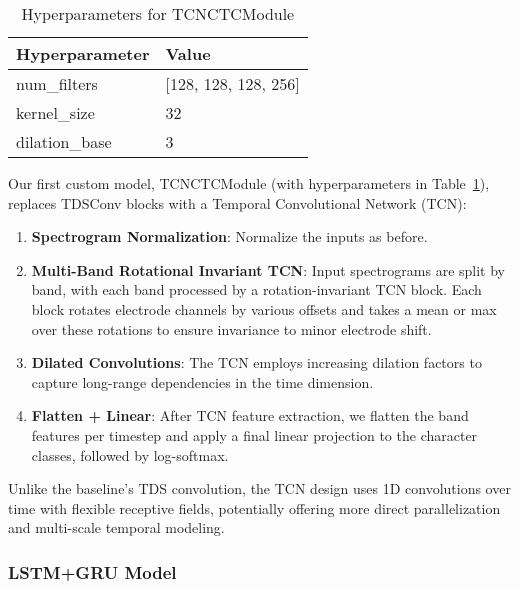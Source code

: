 \begin{table}
    \caption{Hyperparameters for TCNCTCModule}
    \label{tab:tcn_ctc}
    \centering
    \begin{tabular}{ll}
      \toprule
      \textbf{Hyperparameter} & \textbf{Value} \\
      \midrule
      num\_filters & [128, 128, 128, 256] \\
      kernel\_size & 32 \\
      dilation\_base & 3 \\
      \bottomrule
    \end{tabular}
    \label{tab:tcn_hyperparameters}
\end{table}

Our first custom model, TCNCTCModule (with hyperparameters in Table~\ref{tab:tcn_hyperparameters}), replaces TDSConv blocks with a Temporal Convolutional Network (TCN):

\begin{enumerate}
    \item\textbf{Spectrogram Normalization}: Normalize the inputs as before.

    \item\textbf{Multi-Band Rotational Invariant TCN}: Input spectrograms are split by band, with each band processed by a rotation-invariant TCN block. Each block rotates electrode channels by various offsets and takes a mean or max over these rotations to ensure invariance to minor electrode shift.

    \item\textbf{Dilated Convolutions}: The TCN employs increasing dilation factors to capture long-range dependencies in the time dimension.
    
    \item\textbf{Flatten + Linear}: After TCN feature extraction, we flatten the band features per timestep and apply a final linear projection to the character classes, followed by log-softmax.
\end{enumerate}

Unlike the baseline’s TDS convolution, the TCN design uses 1D convolutions over time with flexible receptive fields, potentially offering more direct parallelization and multi-scale temporal modeling.

\subsubsection{LSTM+GRU Model}


